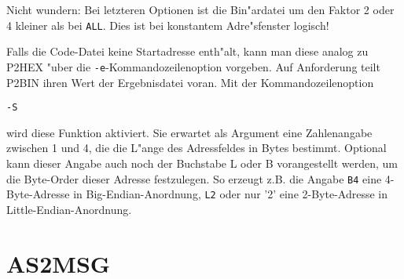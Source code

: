 \documentclass[12pt,a4paper,twoside]{report}
\newcommand{\tty}[1]{{\tt #1}}
\begin{document}
{Nicht wundern: Bei letzteren Optionen ist die Bin"ardatei um den Faktor 2
oder 4 kleiner als bei \tty{ALL}.  Dies ist bei konstantem Adre"sfenster logisch!

Falls die Code-Datei keine Startadresse enth"alt, kann man diese
analog zu P2HEX "uber die \tty{-e}-Kommandozeilenoption vorgeben.  Auf
Anforderung teilt P2BIN ihren Wert der Ergebnisdatei voran.  Mit der
Kommandozeilenoption
\begin{verbatim}
-S
\end{verbatim}
wird diese Funktion aktiviert.  Sie erwartet als Argument eine
Zahlenangabe zwischen 1 und 4,  die die L"ange des Adressfeldes in
Bytes bestimmt.  Optional kann dieser Angabe auch noch der Buchstabe
L oder B vorangestellt werden, um die Byte-Order dieser Adresse
festzulegen.  So erzeugt z.B. die Angabe \tty{B4} eine 4-Byte-Adresse in
Big-Endian-Anordnung, \tty{L2} oder nur '2' eine 2-Byte-Adresse in
Little-Endian-Anordnung.


\section{AS2MSG}

}
\end{document}
